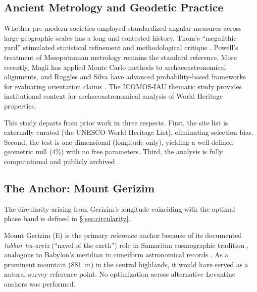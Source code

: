 \documentclass[12pt,a4paper]{article}
\begin{document}
\subsection{Ancient Metrology and Geodetic Practice}

Whether pre-modern societies employed standardized angular measures
across large geographic scales has a long and contested history.
Thom's ``megalithic yard'' \citep{thom1967,thom1971,thom1964}
stimulated statistical refinement \citep{kendall1974} and methodological
critique \citep{freeman1976}. Powell's treatment of Mesopotamian metrology
\citep{powell1987metrological} remains the standard reference. More recently,
Magli \citep{magli2013,magli2016} has applied Monte Carlo methods to
archaeoastronomical alignments, and Ruggles and Silva have advanced
probability-based frameworks for evaluating orientation claims
\citep{ruggles1999astronomy,ruggles2015handbook,silva2020statistical}.
The ICOMOS-IAU thematic study \citep{ruggles2010icomos} provides
institutional context for archaeoastronomical analysis of World Heritage
properties.

This study departs from prior work in three respects. First, the site list
is externally curated (the UNESCO World Heritage List), eliminating selection
bias. Second, the test is one-dimensional (longitude only), yielding a
well-defined geometric null (4\%) with no free parameters. Third, the
analysis is fully computational and publicly archived \citep{tenenbaum2026audit}.



\subsection{The Anchor: Mount Gerizim}
\label{sec:anchor}

The circularity arising from Gerizim's longitude coinciding with the optimal
phase band is defined in \S\ref{sec:circularity}.

Mount Gerizim (\GerizimLon\textdegree{}E) is the primary reference
anchor because of its documented \textit{tabbur ha-aretz} (``navel of the
earth'') role in Samaritan cosmographic tradition
\citep{purvis1968,macdonald1964,crown1989}, analogous to Babylon's meridian
in cuneiform astronomical records \citep{hunger2019mul}. As a prominent
mountain (881~m) in the central highlands, it would have served as a
natural survey reference point. No optimization
across alternative Levantine anchors was performed.
\end{document}
